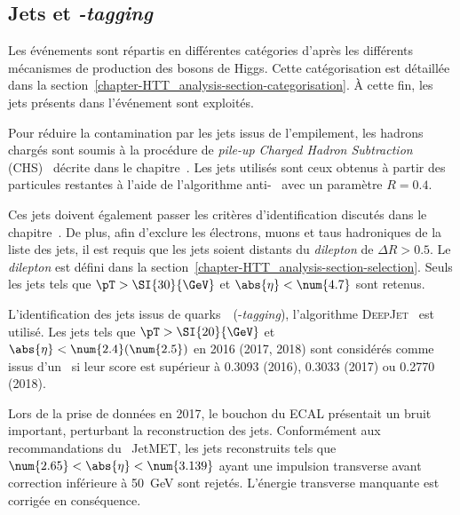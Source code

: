 \subsection{Jets et \emph{\quarkb-tagging}}\label{chapter-HTT_analysis-section-objects-jets}
Les événements sont répartis en différentes catégories d'après les différents mécanismes de production des bosons de Higgs.
Cette catégorisation est détaillée dans la section~\ref{chapter-HTT_analysis-section-categorisation}.
À cette fin, les jets présents dans l'événement sont exploités.
\par
Pour réduire la contamination par les jets issus de l'empilement, les hadrons chargés sont soumis à la procédure de \emph{pile-up Charged Hadron Subtraction} (CHS)~\cite{CMS-PAS-JME-14-001} décrite dans le chapitre~.
Les jets utilisés sont ceux obtenus à partir des particules restantes à l'aide de l'algorithme anti-\kT~\cite{Cacciari_antikT} avec un paramètre $R=\num{0.4}$.
\par
Ces jets doivent également passer les critères d'identification discutés dans le chapitre~.
De plus, afin d'exclure les électrons, muons et taus hadroniques de la liste des jets, il est requis que les jets soient distants du \emph{dilepton} de $\Delta R > \num{0.5}$.
Le \emph{dilepton} est défini dans la section~\ref{chapter-HTT_analysis-section-selection}.
Seuls les jets tels que $\pT > \SI{30}{\GeV}$ et $\abs{\eta}<\num{4.7}$ sont retenus.
\par
L'identification des jets issus de quarks~\quarkb\ (\quarkb-\emph{tagging}), l'algorithme \textsc{DeepJet}~\cite{DeepJet} est utilisé.
Les jets tels que $\pT > \SI{20}{\GeV}$ et $\abs{\eta}<\num{2.4} (\num{2.5})$ en 2016 (2017, 2018) sont considérés comme issus d'un \quarkb\ si leur score est supérieur à \num{0.3093} (2016), \num{0.3033} (2017) ou \num{0.2770} (2018).
\par
Lors de la prise de données en 2017, le bouchon du ECAL présentait un bruit important, perturbant la reconstruction des jets.
Conformément aux recommandations du \POG\ JetMET, les jets reconstruits tels que $\num{2.65} < \abs{\eta} < \num{3.139}$ ayant une impulsion transverse avant correction inférieure à \SI{50}{\GeV} sont rejetés.
L'énergie transverse manquante est corrigée en conséquence.